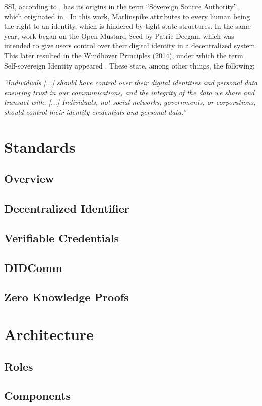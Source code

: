 	    SSI, according to \cite{allen_path_2016}, has its origins in the term “Sovereign Source Authority”, which originated in \cite{marlinspike_what_2012}. In this work, Marlinspike attributes to every human being the right to an identity, which is hindered by tight state structures. In the same year, work began on the Open Mustard Seed by Patric Deegan, which was intended to give users control over their digital identity in a decentralized system. This later resulted in the Windhover Principles (2014), under which the term Self-sovereign Identity appeared \cite{idcubedorg_id3_2014, hub_culture_hubid_2014}. These state, among other things, the following: \cite{allen_path_2016}
	    \begin{displayquote}
            \textit{“Individuals [...] should have control over their digital identities and personal data ensuring trust in our communications, and the integrity of the data we share and transact with. [...] Individuals, not social networks, governments, or corporations, should control their identity credentials and personal data.”}
        \end{displayquote}
	    
	
	\section{Standards}
	    \subsection{Overview}
	    \subsection{Decentralized Identifier}
	    \subsection{Verifiable Credentials}
		\subsection{DIDComm}
		\subsection{Zero Knowledge Proofs}
	\section{Architecture}
	\subsection{Roles}
	\subsection{Components}